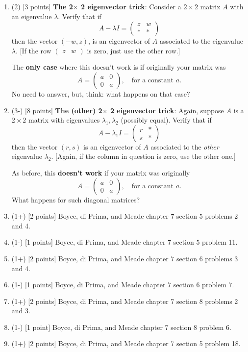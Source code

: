 \documentclass[12pt]{article}
\newcommand{\twobytwo}[4]{\begin{pmatrix} %
   #1 & #2 \\ #3 & #4 \end{pmatrix}}
\begin{document}
\begin{enumerate}
    \item (2) [3 points] \textbf{The 2\(\times\) 2 eigenvector trick}: Consider a \(2\times 2\) matrix \(A\) with an eigenvalue \(\lambda\). Verify that if 
    \[A-\lambda I=\twobytwo{z}{w}{\ast}{\ast}\]
   then the vector \((-w,z)\), is an eigenvector of \(A\) associated to the eigenvalue \(\lambda\). [If the row \(\begin{pmatrix}z&w\end{pmatrix}\) is zero, just use the other row.]\par
   The \textbf{only case} where this doesn't work is if originally your matrix was 
   \[
   A=\twobytwo{a}{0}{0}{a},\quad\text{for a constant }a.
   \]
   No need to answer, but, think: what happens on that case?

   \item (3-) [8 points] \textbf{The (other) 2\(\times\) 2 eigenvector trick}: Again, suppose \(A\) is a \(2\times 2\) matrix with eigenvalues \(\lambda_1,\lambda_2\) (possibly equal). Verify that if 
    \[A-\lambda_1 I=\twobytwo{r}{\ast}{s}{\ast}\]
    then the vector \((r,s)\) is an eigenvector of \(A\) associated to the \emph{other} eigenvalue \(\lambda_2\). [Again, if the column in question is zero, use the other one.]\par
    As before, this \textbf{doesn't work} if your matrix was originally
    \[
   A=\twobytwo{a}{0}{0}{a},\quad\text{for a constant }a.
   \]
   What happens for such diagonal matrices?
   

\item (1+) [2 points] Boyce, di Prima, and Meade chapter 7 section 5 problems 2 and 4.
  
\item (1-) [1 points] Boyce, di Prima, and Meade chapter 7 section 5 problem 11.

\item (1+) [2 points] Boyce, di Prima, and Meade chapter 7 section 6 problems 3 and 4.

\item (1-) [1 points] Boyce, di Prima, and Meade chapter 7 section 6 problem 7.

\item (1+) [2 points] Boyce, di Prima, and Meade chapter 7 section 8 problems 2 and 3.

\item (1-) [1 point] Boyce, di Prima, and Meade chapter 7 section 8 problem 6.

\item (1+) [2 points] Boyce, di Prima, and Meade chapter 7 section 5 problem 18.


\end{enumerate}
\end{document}
